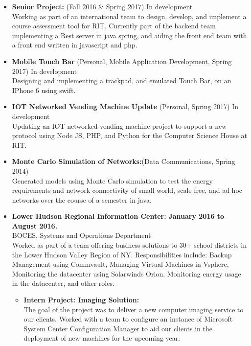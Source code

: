 \documentclass[10pt]{article}
\begin{document}
\begin{itemize}[topsep=1ex, itemsep=1ex, partopsep=0ex, parsep=.25ex]
		\item[] {\bf Senior Project:} (Fall 2016 \& Spring 2017) In development\\
		Working as part of an international team to design, develop, and implement a course assessment tool for RIT. Currently part of the backend team implementing a Rest server in java spring, and aiding the front end  team with a front end written in javascript and php.
        \item[] {\bf Mobile Touch Bar} (Personal, Mobile Application Development, Spring 2017) In development\\
        Designing and implementing a trackpad, and emulated Touch Bar, on an IPhone 6 using swift.
        \item[] {\bf IOT Networked Vending Machine Update} (Personal, Spring 2017) In development\\
        Updating an IOT networked vending machine project to support a new protocol using Node JS, PHP, and Python for the Computer Science House at RIT.
	    \item[] {\bf Monte Carlo Simulation of Networks:}(Data Communications, Spring 2014)\\
	    Generated models using Monte Carlo simulation to test the energy requirements and network connectivity of small world, scale free, and ad hoc networks over the course of a semester in java.
\end{itemize}
\vspace{.75ex}
\begin{itemize}[topsep=1ex, itemsep=1ex, partopsep=0ex, parsep=.25ex]
	\item[] {{\bf Lower Hudson Regional Information Center:} \hfill {\bf January 2016 to August 2016.}}\\
	BOCES, Systems and Operations Department\\
	Worked as part of a team offering business solutions to 30+ school districts in the Lower Hudson Valley Region of NY. Responsibilities include: Backup Management using Commvault, Managing Virtual Machines in Vsphere, Monitoring the datacenter using Solarwinds Orion, Monitoring energy usage in the datacenter, and other roles.
	\begin{itemize} [topsep=.5ex, itemsep=.25ex, partopsep=0ex, parsep=.25ex]
		\item[] {\bf Intern Project: Imaging Solution:}\\
		The goal of the project was to deliver a new computer imaging service to our clients. Worked with a team to configure an instance of Microsoft System Center Configuration Manager to aid our clients in the deployment of new machines for the upcoming year. 
	\end{itemize}
\end{itemize}
\end{document}
